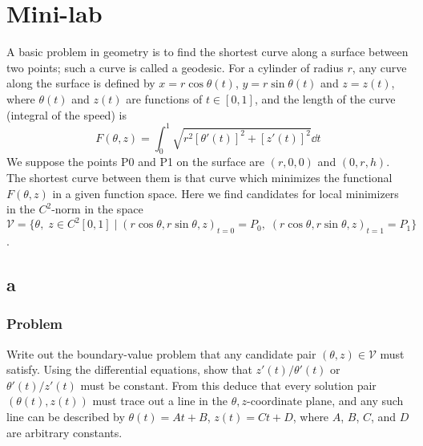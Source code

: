 \documentclass[12pt,twoside]{article}
\begin{document}
\section{Mini-lab}
A basic problem in geometry is to find the shortest curve along a surface
between two points; such a curve is called a geodesic. For a cylinder of radius
$r$, any curve along the surface is defined by $x = r\cos\theta(t)$, $y =
r\sin\theta(t)$ and $z = z(t)$, where $\theta(t)$ and $z(t)$ are functions of $t
\in [0,1]$, and the length of the curve (integral of the speed) is
\begin{equation}
  \label{eq:minilab-curve-length}
  F(\theta,z) = \int_0^1\sqrt{r^2{[\theta'(t)]}^2 + {[z'(t)]}^2}\dd{t}
\end{equation}
We suppose the points P0 and P1 on the surface are $(r,0,0)$ and $(0,r,h)$. The
shortest curve between them is that curve which minimizes the functional
$F(\theta,z)$ in a given function space. Here we find candidates for local
minimizers in the $C^2$-norm in the space $\mathcal{V}=\{\theta,\;z\in
C^2[0,1]\;|\;{(r\cos\theta,r\sin\theta,z)}_{t=0}=P_0,
\;{(r\cos\theta,r\sin\theta,z)}_{t=1}=P_1\}$.

\subsection{a}
\subsubsection*{Problem}
Write out the boundary-value problem that any candidate pair
$(\theta,z)\in\mathcal{V}$ must satisfy. Using the differential equations, show
that $z'(t)/\theta'(t)$ or $\theta'(t)/z'(t)$ must be constant. From this deduce
that every solution pair $(\theta(t),z(t))$ must trace out a line in the
$\theta,z$-coordinate plane, and any such line can be described by $\theta(t) =
At + B$, $z(t) = Ct + D$, where $A$, $B$, $C$, and $D$ are arbitrary constants.
\end{document}
